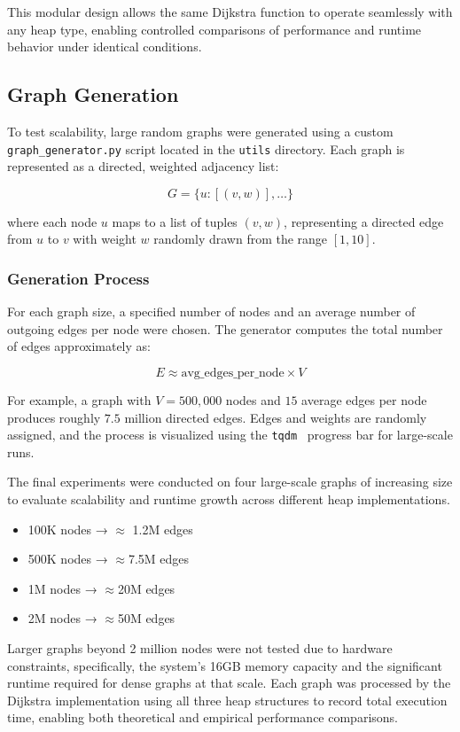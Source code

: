 \documentclass[acmsmall]{acmart}
\begin{document}
This modular design allows the same Dijkstra function to operate seamlessly with any heap type, enabling controlled comparisons of performance and runtime behavior under identical conditions.

\subsection{Graph Generation}
To test scalability, large random graphs were generated using a custom \texttt{graph\_generator.py} script located in the \texttt{utils} directory. Each graph is represented as a directed, weighted adjacency list:

\[
G = \{ u : [(v, w)], \ldots \}
\]

where each node $u$ maps to a list of tuples $(v, w)$, representing a directed edge from $u$ to $v$ with weight $w$ randomly drawn from the range $[1, 10]$.

\subsubsection*{Generation Process}
For each graph size, a specified number of nodes and an average number of outgoing edges per node were chosen.  
The generator computes the total number of edges approximately as:

\[
E \approx \text{avg\_edges\_per\_node} \times V
\]

For example, a graph with $V = 500{,}000$ nodes and $15$ average edges per node produces roughly $7.5$ million directed edges. Edges and weights are randomly assigned, and the process is visualized using the \texttt{tqdm}~\cite{tqdm} progress bar for large-scale runs.

The final experiments were conducted on four large-scale graphs of increasing size to evaluate scalability and runtime growth across different heap implementations.

\begin{itemize}
  \item 100K nodes → $\approx$ 1.2M edges  
  \item 500K nodes → $\approx$7.5M edges  
  \item 1M nodes → $\approx$20M edges  
  \item 2M nodes → $\approx$50M edges  
\end{itemize}

Larger graphs beyond 2 million nodes were not tested due to hardware constraints, specifically, the system’s 16GB memory capacity and the significant runtime required for dense graphs at that scale. Each graph was processed by the Dijkstra implementation using all three heap structures to record total execution time, enabling both theoretical and empirical performance comparisons.
\end{document}
